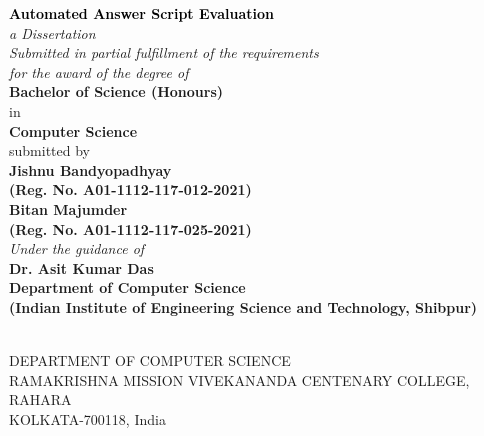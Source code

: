 \newpage
\thispagestyle{empty}
\graphicspath{{Figures/PNG/}{Figures/}}
\begin{center}
	\vspace{2mm}
	\huge \textcolor{black}{\textbf{Automated Answer Script Evaluation}} \\
	\vspace{10mm}
	\large \textit{a Dissertation \\  Submitted in partial fulfillment of the requirements \\ for the award of the degree of} \\
	\vspace{10mm}
	\Large {\textbf{Bachelor of Science (Honours)}} \\
        \large in \\
        \Large {\textbf{Computer Science}} \\
    \vspace{10mm}
    \large submitted by \\
    \vspace{6mm}
	\textbf{{\Large Jishnu Bandyopadhyay} \\ {\large (Reg. No. A01-1112-117-012-2021)}} \\
	\vspace{6mm}
        \textbf{{\Large Bitan Majumder} \\ {\large (Reg. No. A01-1112-117-025-2021)}} \\
        \vspace{6mm}
	\emph{Under the guidance of }\\
        \textbf{{Dr. Asit Kumar Das}  \\  {\large Department of Computer Science}} \\
        \textbf{\large{(Indian Institute of Engineering Science and Technology, Shibpur)}}

		\vspace{4mm}
	\par\vspace{1mm}
	\small{}\\
 \vspace{5mm}
	\large {DEPARTMENT OF COMPUTER SCIENCE\\
			RAMAKRISHNA MISSION VIVEKANANDA CENTENARY COLLEGE, RAHARA\\
			KOLKATA-700118, India}\\
\end{center}

